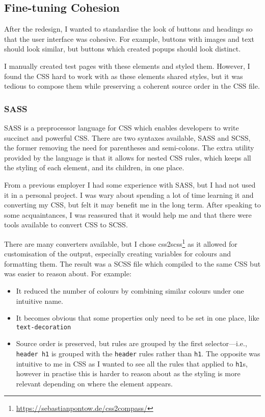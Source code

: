 \documentclass[bsc,frontabs,oneside,singlespacing,parskip,deptreport,logo]{infthesis}
\begin{document}
\subsection{Fine-tuning Cohesion}

After the redesign, I wanted to standardise the look of buttons and headings so that the user interface was cohesive. For example, buttons with images and text should look similar, but buttons which created popups should look distinct.

I manually created test pages with these elements and styled them. However, I found the CSS hard to work with as these elements shared styles, but it was tedious to compose them while preserving a coherent source order in the CSS file.

\subsubsection{SASS}

SASS is a preprocessor language for CSS which enables developers to write succinct and powerful CSS\@. There are two syntaxes available, SASS and SCSS, the former removing the need for parentheses and semi-colons. The extra utility provided by the language is that it allows for nested CSS rules, which keeps all the styling of each element, and its children, in one place.


From a previous employer I had some experience with SASS, but I had not used it in a personal project. I was wary about spending a lot of time learning it and converting my CSS, but felt it may benefit me in the long term. After speaking to some acquaintances, I was reassured that it would help me and that there were tools available to convert CSS to SCSS\@.

There are many converters available, but I chose css2scss\footnote{\url{https://sebastianpontow.de/css2compass/}} as it allowed for customisation of the output, especially creating variables for colours and formatting them. The result was a SCSS file which compiled to the same CSS but was easier to reason about. For example:

\begin{itemize}
    \item It reduced the number of colours by combining similar colours under one intuitive name.
    \item It becomes obvious that some properties only need to be set in one place, like \verb|text-decoration|
    \item Source order is preserved, but rules are grouped by the first selector---i.e., \verb|header h1| is grouped with the \verb|header| rules rather than \verb|h1|. The opposite was intuitive to me in CSS as I wanted to see all the rules that applied to \verb|h1|s, however in practise this is harder to reason about as the styling is more relevant depending on where the element appears.
\end{itemize}
\end{document}
